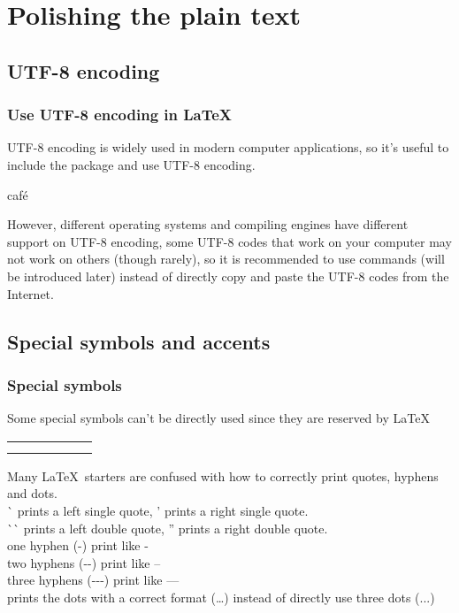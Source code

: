 
\section{Polishing the plain text}

\subsection{UTF-8 encoding}

\begin{frame}[fragile]
	\frametitle{Use UTF-8 encoding in \LaTeX}
	UTF-8 encoding is widely used in modern computer applications, so it's useful to include the  package and use UTF-8 encoding.
	\begin{command}
		\LC{\usepackage[utf-8]{inputenc}}
	\end{command}
	\begin{example}
		café
	\end{example}
	However, different operating systems and compiling engines have different support on UTF-8 encoding, some UTF-8 codes that work on your computer may not work on others (though rarely), so it is recommended to use commands (will be introduced later) instead of directly copy and paste the UTF-8 codes from the Internet.
\end{frame}

\subsection{Special symbols and accents}

\begin{frame}
	\frametitle{Special symbols}
	Some special symbols can't be directly used since they are reserved by \LaTeX
	\begin{center}
	\begin{tabular}{llllll}
		\samplesymbol{\#}{\#} & \samplesymbol{\$}{\$} & \samplesymbol{\%}{\%} & \samplesymbol{\&}{\&} & \samplesymbol{\~{}}{\~{}} & \samplesymbol{\`{}}{\`{}} \\
		\samplesymbol{\{}{\{} & \samplesymbol{\}}{\}} & \samplesymbol{\_}{\_} &
		\multicolumn{2}{l}{\samplesymbol{textbackslash}{\textbackslash}}
	\end{tabular}
	\end{center}
	Many \LaTeX\ starters are confused with how to correctly print quotes, hyphens and dots.\\
	\`{} prints a left single quote, ' prints a right single quote.\\
	\`{}\`{} prints a left double quote, '' prints a right double quote.\\
	one hyphen (-) print like - \\
	two hyphens ({-}{-}) print like -- \\
	three hyphens ({-}{-}{-}) print like ---\\
	 prints the dots with a correct format (\dots) instead of directly use three dots (...)
\end{frame}

